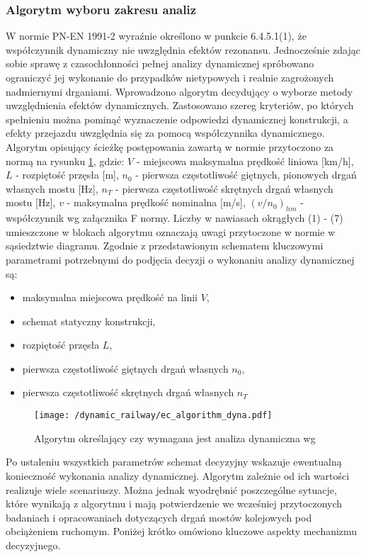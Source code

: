 \subsubsection{Algorytm wyboru zakresu analiz}
W normie PN-EN 1991-2 wyraźnie określono w punkcie 6.4.5.1(1), że współczynnik dynamiczny nie uwzględnia efektów rezonansu. Jednocześnie zdając sobie sprawę z czasochłonności pełnej analizy dynamicznej spróbowano ograniczyć jej wykonanie do przypadków nietypowych i realnie zagrożonych nadmiernymi drganiami. Wprowadzono algorytm decydujący o wyborze metody uwzględnienia efektów dynamicznych. Zastosowano szereg kryteriów, po których spełnieniu można pominąć wyznaczenie odpowiedzi dynamicznej konstrukcji, a efekty przejazdu uwzględnia się za pomocą współczynnika dynamicznego. Algorytm opisujący ścieżkę postępowania zawartą w normie przytoczono za normą \parencite{PKNj} na rysunku \ref{fig:ec_algorithm_dyna}, gdzie: $V$ - miejscowa maksymalna prędkość liniowa [km/h], $L$ - rozpiętość przęsła [m], $n_0$ - pierwsza częstotliwość giętnych, pionowych drgań własnych mostu [Hz], $n_T$ - pierwsza częstotliwość skrętnych drgań własnych mostu [Hz], $v$ - maksymalna prędkość nominalna [m/s], $(v/n_0)_{lim}$ - współczynnik wg załącznika F normy. Liczby w nawiasach okrągłych (1) - (7) umieszczone w blokach algorytmu oznaczają uwagi przytoczone w normie w sąsiedztwie diagramu. Zgodnie z przedstawionym schematem kluczowymi parametrami potrzebnymi do podjęcia decyzji o wykonaniu analizy dynamicznej są:
\begin{itemize}
	\item maksymalna miejscowa prędkość na linii $V$,
	\item schemat statyczny konstrukcji,
	\item rozpiętość przęsła $L$, 
	\item pierwsza częstotliwość giętnych drgań własnych $n_0$,
	\item pierwsza częstotliwość skrętnych drgań własnych $n_T$
\end{itemize}
\begin{figure}[p]
	\centering
	\texttt{[image: /dynamic\_railway/ec\_algorithm\_dyna.pdf]} 
	\captionsetup{justification=centering}
	\caption{Algorytm określający czy wymagana jest analiza dynamiczna wg \parencite{PKNj}}
	\label{fig:ec_algorithm_dyna}
\end{figure}

Po ustaleniu wszystkich parametrów schemat decyzyjny wskazuje ewentualną konieczność wykonania analizy dynamicznej. Algorytm zależnie od ich wartości realizuje wiele scenariuszy. Można jednak wyodrębnić poszczególne sytuacje, które wynikają z algorytmu i mają potwierdzenie we wcześniej przytoczonych badaniach i opracowaniach dotyczących drgań mostów kolejowych pod obciążeniem ruchomym. Poniżej krótko omówiono kluczowe aspekty mechanizmu decyzyjnego. 

